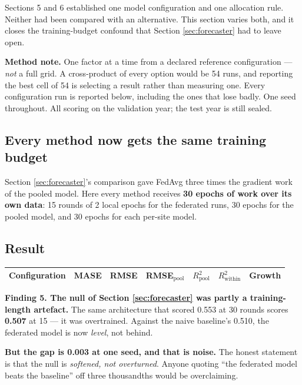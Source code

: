 \documentclass[11pt,a4paper]{article}
\newcommand{\keypoint}[1]{%
  \par\vspace{0.4em}%
  \noindent\colorbox{fed!8}{\parbox{0.98\textwidth}{\vspace{0.2em}#1\vspace{0.2em}}}%
  \par\vspace{0.4em}}
\begin{document}
Sections 5 and 6 established one model configuration and one allocation rule. Neither had been
compared with an alternative. This section varies both, and it closes the training-budget confound
that Section \ref{sec:forecaster} had to leave open.

\keypoint{\textbf{Method note.} One factor at a time from a declared reference configuration ---
\emph{not} a full grid. A cross-product of every option would be 54 runs, and reporting the best cell
of 54 is selecting a result rather than measuring one. Every configuration run is reported below,
including the ones that lose badly. One seed throughout. All scoring on the validation year; the test
year is still sealed.}

\subsection{Every method now gets the same training budget}

Section \ref{sec:forecaster}'s comparison gave FedAvg three times the gradient work of the pooled model. Here every method
receives \textbf{30 epochs of work over its own data}: 15 rounds of 2 local epochs for the federated
runs, 30 epochs for the pooled model, and 30 epochs for each per-site model.

\subsection{Result}

\begin{center}
\scriptsize
\begin{tabular}{@{}lrrrrrr@{}}
\toprule
\textbf{Configuration} & \textbf{MASE} & \textbf{RMSE} & \textbf{RMSE$_{\text{pool}}$} & \textbf{$R^2_{\text{pool}}$} & \textbf{$R^2_{\text{within}}$} & \textbf{Growth} \\
\midrule
\bottomrule
\end{tabular}
\end{center}

\keypoint{\textbf{Finding 5. The null of Section \ref{sec:forecaster} was partly a training-length artefact.} The same
architecture that scored 0.553 at 30 rounds scores \textbf{0.507} at 15 --- it was overtrained. Against
the naive baseline's 0.510, the federated model is now \emph{level}, not behind.

\textbf{But the gap is 0.003 at one seed, and that is noise.} The honest statement is that the null is
\emph{softened, not overturned}. Anyone quoting ``the federated model beats the baseline'' off three
thousandths would be overclaiming.}
\end{document}
